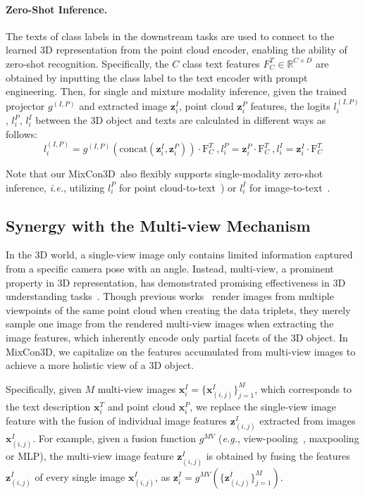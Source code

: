 \documentclass{article} \usepackage{iclr2024_conference,times}
\newcommand{\ourmethod}{MixCon3D}
\begin{document}
\paragraph{Zero-Shot Inference.}
The texts of class labels in the downstream tasks are used to connect to the learned 3D representation from the point cloud encoder, enabling the ability of zero-shot recognition.
Specifically, the $C$ class text features $F^T_{C} \in \mathbb{R}^{C\times D} $ are obtained by inputting the class label to the text encoder with prompt engineering.
Then, for single and mixture modality inference, given the trained projector $g^{(I, P)}$ and extracted image $\bm{z}^I_i$, point cloud $\bm{z}^P_i$ features, the logits $l_i^{(I, P)}$, $l_i^{P}$, $l_i^{I}$ between the 3D object and texts are calculated in different ways as follows:
\begin{equation}
\label{eq:2_to_1_inference}
l_i^{(I, P)} = g^{(I, P)}(\mathrm{concat}(\bm{z}_{i}^{I}, \bm{z}_{i}^{P})) \cdot \mathrm{F}^T_{C}\ , l_i^{P} = \bm{z}_{i}^{P} \cdot \mathrm{F}^T_{C}\ , l_i^{I} = \bm{z}_{i}^{I} \cdot \mathrm{F}^T_{C}
\end{equation}

Note that our \ourmethod~also flexibly supports single-modality zero-shot inference, \textit{i.e.}, utilizing $l_i^{P}$ for point cloud-to-text~\citep{ulip, ulip2, openshape}) or $l_i^{I}$ for image-to-text~\citep{zhang2022pointclip, zhu2022pointclipv2}.


\subsection{Synergy with the Multi-view Mechanism}
\label{subsec:multi-view}
In the 3D world, a single-view image only contains limited information captured from a specific camera pose with an angle.
Instead, multi-view, a prominent property in 3D representation, has demonstrated promising effectiveness in 3D understanding tasks~\citep{MVConv,jaritz2019multi,hamdi2021mvtn,hamdi2023voint}.  
Though previous works~\citep{ulip,ulip2,openshape} render images from multiple viewpoints of the same point cloud when creating the data triplets, they merely sample one image from the rendered multi-view images when extracting the image features, which inherently encode only partial facets of the 3D object.
In \ourmethod, we capitalize on the features accumulated from multi-view images to achieve a more holistic view of a 3D object.

Specifically, given $M$ multi-view images $\bm{x}_i^{I}=\{\bm{x}_{(i,j)}^{I}\}_{j=1}^{M}$, which corresponds to the text description $\bm{x}_{i}^{T}$ and point cloud $\bm{x}_{i}^{P}$, we replace the single-view image feature with the fusion of individual image features $\bm{z}_{(i,j)}^{I}$ extracted from images $\bm{x}_{(i,j)}^{I}$.
For example, given a fusion function $g^{MV}$ (\textit{e.g.}, view-pooling~\citep{MVConv}, maxpooling or MLP), the multi-view image feature $\bm{z}_{(i,j)}^{I}$ is obtained by fusing the features $\bm{z}_{(i,j)}^{I}$ of every single image $\bm{x}_{(i,j)}^{I}$, as $\bm{z}_{i}^{I} = g^{MV}(\{\bm{z}_{(i,j)}^{I}\}_{j=1}^{M})$.
\end{document}

